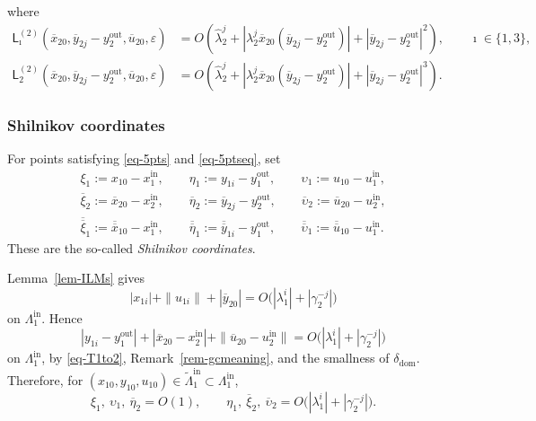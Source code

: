 \documentclass[11pt,a4paper]{article}
\theoremstyle{plain}
\theoremstyle{definition}
\theoremstyle{plain}
\numberwithin{equation}{section}
\begin{document}
where
\begin{align*}
\mathsf{L}_\imath^{(2)}(\overline{x}_{20}, \overline{y}_{2j} - y_2^\mathrm{out}, \overline{u}_{20}, \varepsilon)
&=
O\!\left(
\widehat{\lambda}_2^j
+
|\lambda_2^j \overline{x}_{20}(\overline{y}_{2j} - y_2^\mathrm{out})|
+
|\overline{y}_{2j} - y_2^\mathrm{out}|^2
\right),
\qquad
\imath \in \{1,3\},
\\
\mathsf{L}_2^{(2)}(\overline{x}_{20}, \overline{y}_{2j} - y_2^\mathrm{out}, \overline{u}_{20}, \varepsilon)
&=
O\!\left(
\widehat{\lambda}_2^j
+
|\lambda_2^j \overline{x}_{20}(\overline{y}_{2j} - y_2^\mathrm{out})|
+
|\overline{y}_{2j} - y_2^\mathrm{out}|^3
\right).
\end{align*}

\subsubsection{Shilnikov coordinates}

For points satisfying \eqref{eq-5pts} and \eqref{eq-5ptseq}, set
\begin{equation}
\label{eq-shilcoords}
\begin{aligned}
\xi_1 := x_{10} - x_1^\mathrm{in},
\qquad
\eta_1 := y_{1i} - y_1^\mathrm{out},
\qquad
\upsilon_1 := u_{10} - u_1^\mathrm{in},
\\
\overline{\xi}_2 := \overline{x}_{20} - x_2^\mathrm{in},
\qquad
\overline{\eta}_2 := \overline{y}_{2j} - y_2^\mathrm{out},
\qquad
\overline{\upsilon}_2 := \overline{u}_{20} - u_2^\mathrm{in},
\\
\overline{\overline{\xi}}_1 := \overline{\overline{x}}_{10} - x_1^\mathrm{in},
\qquad
\overline{\overline{\eta}}_1 := \overline{\overline{y}}_{1i} - y_1^\mathrm{out},
\qquad
\overline{\overline{\upsilon}}_1 := \overline{\overline{u}}_{10} - u_1^\mathrm{in}.
\end{aligned}
\end{equation}
These are the so-called \emph{Shilnikov coordinates}.

Lemma~\ref{lem-ILMs} gives
\[
|x_{1i}| + \|u_{1i}\| + |\overline{y}_{20}|
=
O\bigl(|\lambda_1^i| + |\gamma_2^{-j}|\bigr)
\]
on $\Lambda_1^\mathrm{in}$. Hence
\begin{equation}
\label{eq-domain-bd}
|y_{1i} - y_1^\mathrm{out}|
+
|\overline{x}_{20} - x_2^\mathrm{in}|
+
\|\overline{u}_{20} - u_2^\mathrm{in}\|
=
O\bigl(|\lambda_1^i| + |\gamma_2^{-j}|\bigr)
\end{equation}
on $\Lambda_1^\mathrm{in}$, by \eqref{eq-T1to2}, Remark~\ref{rem-gcmeaning}, and the smallness of $\delta_\mathrm{dom}$. Therefore, for $(x_{10},y_{10},u_{10}) \in \widetilde{\Lambda}_1^\mathrm{in} \subset \Lambda_1^\mathrm{in}$,
\begin{equation}
\label{eq-shilrest}
\xi_1,\ \upsilon_1,\ \overline{\eta}_2
=
O(1),
\qquad
\eta_1,\ \overline{\xi}_2,\ \overline{\upsilon}_2
=
O\bigl(|\lambda_1^i| + |\gamma_2^{-j}|\bigr).
\end{equation}
\end{document}
